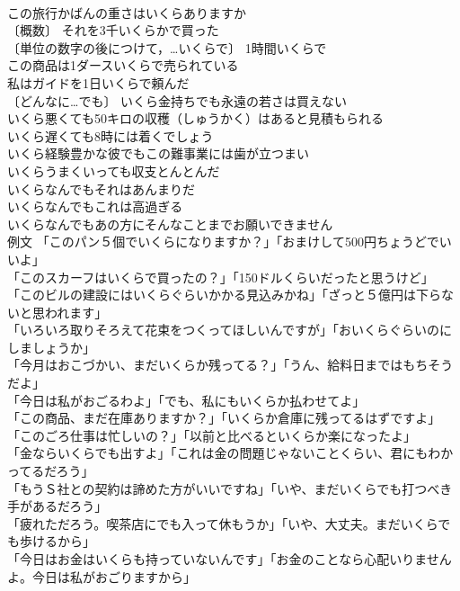 \documentclass[8pt]{extreport}
\begin{document}
\begin{CJK}{UTF8}{min}
\\	この旅行かばんの重さはいくらありますか 
\\	〔概数〕 それを3千いくらかで買った 
\\	〔単位の数字の後につけて，…いくらで〕 1時間いくらで 
\\	この商品は1ダースいくらで売られている 
\\	私はガイドを1日いくらで頼んだ 
\\	〔どんなに…でも〕 いくら金持ちでも永遠の若さは買えない 
\\	いくら悪くても50キロの収穫（しゅうかく）はあると見積もられる 
\\	いくら遅くても8時には着くでしょう 
\\	いくら経験豊かな彼でもこの難事業には歯が立つまい 
\\	いくらうまくいっても収支とんとんだ 
\\	いくらなんでもそれはあんまりだ 
\\	いくらなんでもこれは高過ぎる 
\\	いくらなんでもあの方にそんなことまでお願いできません 
\\	例文 「このパン５個でいくらになりますか？」「おまけして500円ちょうどでいいよ」 
\\	「このスカーフはいくらで買ったの？」「150ドルくらいだったと思うけど」 
\\	「このビルの建設にはいくらぐらいかかる見込みかね」「ざっと５億円は下らないと思われます」 
\\	「いろいろ取りそろえて花束をつくってほしいんですが」「おいくらぐらいのにしましょうか」 
\\	「今月はおこづかい、まだいくらか残ってる？」「うん、給料日まではもちそうだよ」 
\\	「今日は私がおごるわよ」「でも、私にもいくらか払わせてよ」 
\\	「この商品、まだ在庫ありますか？」「いくらか倉庫に残ってるはずですよ」 
\\	「このごろ仕事は忙しいの？」「以前と比べるといくらか楽になったよ」 
\\	「金ならいくらでも出すよ」「これは金の問題じゃないことくらい、君にもわかってるだろう」 
\\	「もうＳ社との契約は諦めた方がいいですね」「いや、まだいくらでも打つべき手があるだろう」 
\\	「疲れただろう。喫茶店にでも入って休もうか」「いや、大丈夫。まだいくらでも歩けるから」 
\\	「今日はお金はいくらも持っていないんです」「お金のことなら心配いりませんよ。今日は私がおごりますから」 

\end{CJK}
\end{document}
